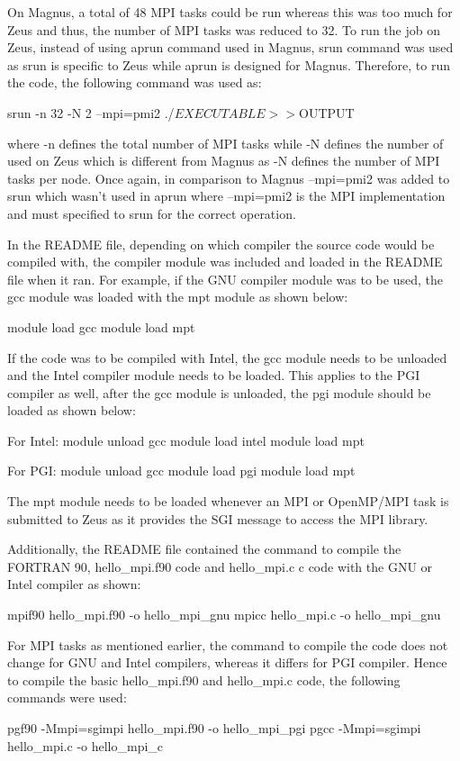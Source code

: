 \documentclass[journal]{IEEEtran}
\begin{document}
On Magnus, a total of 48 MPI tasks could be run whereas this was too much for Zeus and thus, the number of MPI tasks was reduced to 32. To run the job
on Zeus, instead of using aprun command used in Magnus, srun command was used as srun is specific to Zeus while aprun is designed for Magnus. Therefore,
to run the code, the following command was used as:

srun -n 32 -N 2 --mpi=pmi2 ./$EXECUTABLE >> ${OUTPUT}

where -n defines the total number of MPI tasks while -N defines the number of used on Zeus which is different from Magnus as -N defines the number of
MPI tasks per node. Once again, in comparison to Magnus --mpi=pmi2 was added to srun which wasn't used in aprun where --mpi=pmi2 is the MPI
implementation and must specified to srun for the correct operation.

In the README file, depending on which compiler the source code would be compiled with, the compiler module was included and loaded in the README file 
when it ran. For example, if the GNU compiler module was to be used, the gcc module was loaded with the mpt module as shown below:

module load gcc
module load mpt

If the code was to be compiled with Intel, the gcc module needs to be unloaded and the Intel compiler module needs to be loaded. This applies to the PGI
compiler as well, after the gcc module is unloaded, the pgi module should be loaded as shown below:

For Intel:
module unload gcc
module load intel
module load mpt

For PGI:
module unload gcc
module load pgi
module load mpt

The mpt module needs to be loaded whenever an MPI or OpenMP/MPI task is submitted to Zeus as it provides the SGI message to access the MPI library.

Additionally, the README file contained the command to compile the FORTRAN 90, hello_mpi.f90 code and hello_mpi.c c code with the GNU or Intel compiler 
as shown:

mpif90 hello_mpi.f90 -o hello_mpi_gnu
mpicc hello_mpi.c -o hello_mpi_gnu

For MPI tasks as mentioned earlier, the command to compile the code does not change for GNU and Intel compilers, whereas it differs for PGI compiler.
Hence to compile the basic hello_mpi.f90 and hello_mpi.c code, the following commands were used:

pgf90 -Mmpi=sgimpi hello_mpi.f90 -o hello_mpi_pgi
pgcc -Mmpi=sgimpi hello_mpi.c -o hello_mpi_c 
  
\end{document}
